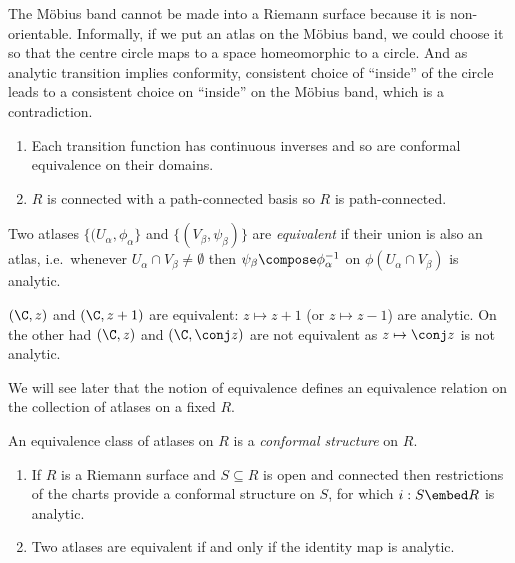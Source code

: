 \documentclass[a4paper]{article}
\begin{document}
\begin{eg}
  The Möbius band cannot be made into a Riemann surface because it is non-orientable. Informally, if we put an atlas on the Möbius band, we could choose it so that the centre circle maps to a space homeomorphic to a circle. And as analytic transition implies conformity, consistent choice of ``inside'' of the circle leads to a consistent choice on ``inside'' on the Möbius band, which is a contradiction.
\end{eg}

\begin{remark}\leavevmode
  \begin{enumerate}
  \item Each transition function has continuous inverses and so are conformal equivalence on their domains.
  \item \(R\) is connected with a path-connected basis so \(R\) is path-connected.
  \end{enumerate}
\end{remark}

\begin{definition}
  Two atlases \(\{(U_\alpha, \phi_\alpha\}\) and \(\{(V_\beta, \psi_\beta)\}\) are \emph{equivalent} if their union is also an atlas, i.e.\ whenever \(U_\alpha \cap V_\beta \neq \emptyset\) then \(\psi_\beta \compose \phi_\alpha^{-1}\) on \(\phi(U_\alpha \cap V_\beta)\) is analytic.
\end{definition}

\begin{eg}
  \((\C, z)\) and \((\C, z + 1)\) are equivalent: \(z \mapsto z + 1\) (or \(z \mapsto z - 1\)) are analytic. On the other had \((\C, z)\) and \((\C, \conj z)\) are not equivalent as \(z \mapsto \conj z\) is not analytic.
\end{eg}

We will see later that the notion of equivalence defines an equivalence relation on the collection of atlases on a fixed \(R\).

\begin{definition}
  An equivalence class of atlases on \(R\) is a \emph{conformal structure} on \(R\).
\end{definition}

\begin{remark}\leavevmode
  \begin{enumerate}
  \item If \(R\) is a Riemann surface and \(S \subseteq R\) is open and connected then restrictions of the charts provide a conformal structure on \(S\), for which \(i: S \embed R\) is analytic.
  \item Two atlases are equivalent if and only if the identity map is analytic.
  \end{enumerate}
\end{remark}
\end{document}
